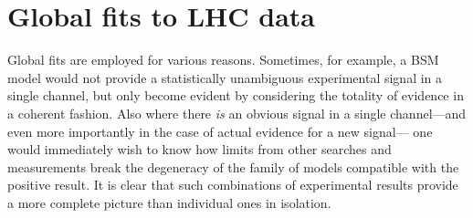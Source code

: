 \documentclass[a4paper,aps,prd,longbibliography,notitlepage,showpacs,amsmath,amssymb,superscriptaddress,nofootinbib,floatfix,11pt,preprintnumbers]{revtex4-1-mod}
\newcommand{\hepdata}{\textsf{HEPData}\xspace}
\renewcommand{\emph}[1]{\textit{#1}}
\begin{document}
%


\section{Global fits to LHC data} \label{sec:fits}

Global fits are employed for various reasons. Sometimes, for example, a BSM model
would not provide a statistically unambiguous experimental signal in a single channel, but only become evident by considering the totality of evidence in a coherent fashion.
Also where there \emph{is} an obvious signal in a single channel---and even more importantly in the case of actual evidence for a new signal---
one would immediately wish to know how limits from other searches and measurements break the degeneracy of the family of models compatible with the positive result. It is clear that such combinations of experimental results provide a more complete picture than individual ones in isolation.
\end{document}
